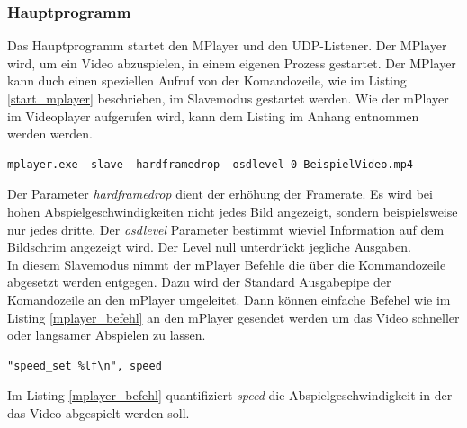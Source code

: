 \subsubsection{Hauptprogramm}
Das Hauptprogramm startet den MPlayer und den UDP-Listener. Der MPlayer wird, um ein Video abzuspielen, in einem eigenen Prozess gestartet. Der MPlayer kann duch einen speziellen Aufruf von der Komandozeile, wie im Listing \ref{start_mplayer} beschrieben, im Slavemodus gestartet werden. Wie der mPlayer im Videoplayer aufgerufen wird, kann dem Listing im Anhang  entnommen werden werden. 
\begin{lstlisting}[caption={Starten des MPlayers in einem eigenen Prozess}, label={start_mplayer}]
mplayer.exe -slave -hardframedrop -osdlevel 0 BeispielVideo.mp4
\end{lstlisting}
Der Parameter \textit{hardframedrop} dient der erhöhung der Framerate. Es wird bei hohen Abspielgeschwindigkeiten nicht jedes Bild angezeigt, sondern beispielsweise nur jedes dritte. Der \textit{osdlevel} Parameter bestimmt wieviel Information auf dem Bildschrim angezeigt wird. Der Level null unterdrückt jegliche Ausgaben.\\
In diesem Slavemodus nimmt der mPlayer Befehle die über die Kommandozeile abgesetzt werden entgegen. Dazu wird der Standard Ausgabepipe der Komandozeile an den mPlayer umgeleitet. Dann können einfache Befehel wie im Listing \ref{mplayer_befehl} an den mPlayer gesendet werden um das Video schneller oder langsamer Abspielen zu lassen. 
\begin{lstlisting}[caption={Befehl an den mPlayer über den Stardard Ausgabe Pipe}, label={mplayer_befehl}]
"speed_set %lf\n", speed
\end{lstlisting}
Im Listing \ref{mplayer_befehl} quantifiziert \textit{speed} die Abspielgeschwindigkeit in der das Video abgespielt werden soll. 